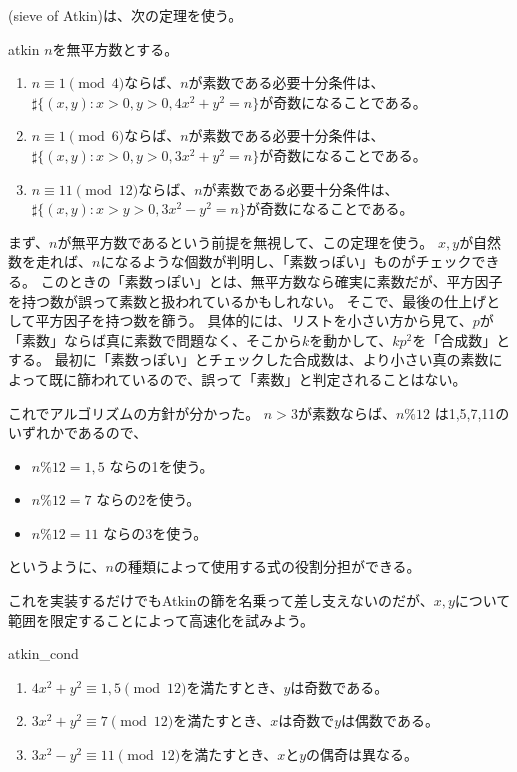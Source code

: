 
(sieve of Atkin)\cite{atkin_sieve}は、次の定理を使う。

\begin{Theo}{}{atkin}
$n$を無平方数とする。
\begin{enumerate}
 \item $n \equiv 1\pmod{4}$ならば、$n$が素数である必要十分条件は、$\sharp\{(x,y): x>0,y>0,4x^2+y^2=n\}$が奇数になることである。
 \item $n \equiv 1\pmod{6}$ならば、$n$が素数である必要十分条件は、$\sharp\{(x,y): x>0,y>0,3x^2+y^2=n\}$が奇数になることである。
 \item $n \equiv 11\pmod{12}$ならば、$n$が素数である必要十分条件は、$\sharp\{(x,y): x>y>0,3x^2-y^2=n\}$が奇数になることである。
\end{enumerate}
\end{Theo}

まず、$n$が無平方数であるという前提を無視して、この定理を使う。
$x,y$が自然数を走れば、$n$になるような個数が判明し、「素数っぽい」ものがチェックできる。
このときの「素数っぽい」とは、無平方数なら確実に素数だが、平方因子を持つ数が誤って素数と扱われているかもしれない。
そこで、最後の仕上げとして平方因子を持つ数を篩う。
具体的には、リストを小さい方から見て、$p$が「素数」ならば真に素数で問題なく、そこから$k$を動かして、$kp^2$を「合成数」とする。
最初に「素数っぽい」とチェックした合成数は、より小さい真の素数によって既に篩われているので、誤って「素数」と判定されることはない。

これでアルゴリズムの方針が分かった。
$n>3$が素数ならば、$n \% 12$ は1,5,7,11のいずれかであるので、
\begin{itemize}
 \item $n \% 12 = 1,5$ ならの1を使う。
 \item $n \% 12 = 7$ ならの2を使う。
 \item $n \% 12 =11$ ならの3を使う。
\end{itemize}
というように、$n$の種類によって使用する式の役割分担ができる。

これを実装するだけでもAtkinの篩を名乗って差し支えないのだが、$x,y$について範囲を限定することによって高速化を試みよう。

\begin{Prop}{}{atkin_cond}\;
\begin{enumerate}
 \item $4x^2+y^2 \equiv 1,5 \pmod{12}$を満たすとき、$y$は奇数である。
 \item $3x^2+y^2 \equiv 7 \pmod{12}$を満たすとき、$x$は奇数で$y$は偶数である。
 \item $3x^2-y^2 \equiv 11 \pmod{12}$を満たすとき、$x$と$y$の偶奇は異なる。
\end{enumerate}
\end{Prop}

